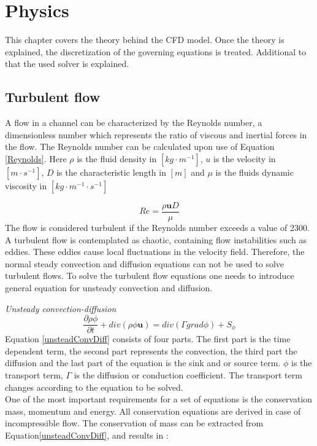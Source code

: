 \documentclass{CFD2017}
\begin{document}
\section{Physics}
This chapter covers the theory behind the CFD model. Once the theory is explained, the discretization of the governing equations is treated. Additional to that the used solver is explained.

\subsection{Turbulent flow}
A flow in a channel can be characterized by the Reynolds number, a dimensionless number which represents the ratio of viscous and inertial forces in the flow. The Reynolds number can be calculated upon use of Equation \ref{Reynolds}\cite{Versteeg2007}. Here $\rho$ is the fluid density in $[kg\cdot m^{-1}]$, $u$ is the velocity in $[m\cdot s^{-1}]$, $D$ is the characteristic length in $[m]$ and $\mu$ is the fluids dynamic viscosity in $[kg\cdot m^{-1}\cdot s^{-1}]$

\begin{equation}
\label{Reynolds}
Re = \frac{\rho \boldsymbol{u} D}{\mu}
\end{equation}
The flow is considered turbulent if the Reynolds number exceeds a value of 2300. A turbulent flow is contemplated as chaotic, containing flow instabilities such as eddies. These eddies cause local fluctuations in the velocity field. Therefore, the normal steady convection and diffusion equations can not be used to solve turbulent flows. To solve the turbulent flow equations one needs to introduce general equation for unsteady convection and diffusion\cite{Versteeg2007}.\vspace{2mm}

\emph{Unsteady convection-diffusion}
\begin{equation}
\label{unsteadConvDiff}
\frac{\partial \rho \phi}{\partial t} + div(\rho\phi\mathbf u)= div(\Gamma grad \phi)+S_{\phi}
\end{equation}
Equation \ref{unsteadConvDiff} consists of four parts. The first part is the time dependent term, the second part represents the convection, the third part the diffusion and the last part of the equation is the sink and or source term. $\phi$ is the transport term, $\Gamma$ is the diffusion or conduction coefficient. The transport term changes according to the equation to be solved. \\
One of the most important requirements for a set of equations is the conservation mass, momentum and energy. All conservation equations are derived in case of incompressible flow. The conservation of mass can be extracted from Equation\ref{unsteadConvDiff}, and results in \cite{slides}:\vspace{2mm}
\end{document}
